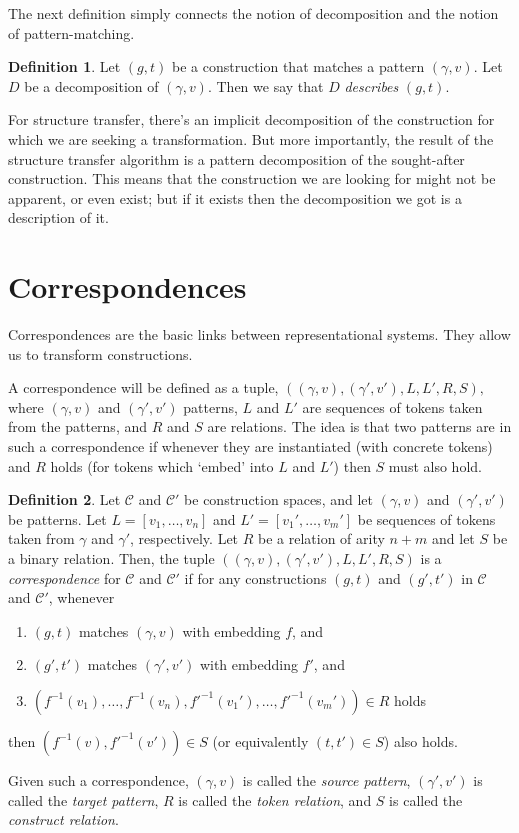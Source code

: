 \documentclass[a4paper]{article}
\theoremstyle{definition}
\newtheorem{definition}{Definition}
\begin{document}
	The next definition simply connects the notion of decomposition and the notion of pattern-matching. 
	\begin{definition}
		Let $(g,t)$ be a construction that matches a pattern $(\gamma,v)$. Let $D$ be a decomposition of $(\gamma,v)$. Then we say that $D$ \textit{describes} $(g,t)$.
	\end{definition}
	
	For structure transfer, there's an implicit decomposition of the construction for which we are seeking a transformation. But more importantly, the result of the structure transfer algorithm is a pattern decomposition of the sought-after construction. This means that the construction we are looking for might not be apparent, or even exist; but if it exists then the decomposition we got is a description of it.
	
	\section{Correspondences}
	Correspondences are the basic links between representational systems. They allow us to transform constructions.
	
	A correspondence will be defined as a tuple, $((\gamma,v),(\gamma',v'),L,L',R, S),$
	where $(\gamma,v)$ and $(\gamma',v')$ patterns, $L$ and $L'$ are sequences of tokens taken from the patterns, and $R$ and $S$ are relations. The idea is that two patterns are in such a correspondence if whenever they are instantiated (with concrete tokens) and $R$ holds (for tokens which `embed' into $L$ and $L'$) then $S$ must also hold.
	
	\newpage
	\begin{definition}
		Let $\mathcal{C}$ and $\mathcal{C}'$ be construction spaces, and let $(\gamma,v)$ and $(\gamma',v')$ be patterns. Let $L=[v_1,\ldots,v_n]$ and $L'=[v_1',\ldots,v_m']$ be sequences of tokens taken from $\gamma$ and $\gamma'$, respectively. Let $R$ be a relation of arity $n+m$ and let $S$ be a binary relation. Then, the tuple $((\gamma,v),(\gamma',v'),L,L',R, S)$ is a \textit{correspondence} for $\mathcal{C}$ and $\mathcal{C}'$ if 
		for any constructions $(g,t)$ and $(g',t')$ in $\mathcal{C}$ and $\mathcal{C}'$, whenever
		\begin{enumerate}[itemsep=1pt]
			\item $(g,t)$ matches $(\gamma,v)$ with embedding $f$, and
			\item $(g',t')$ matches $(\gamma',v')$ with embedding $f'$, and
			\item $(f^{-1}(v_1),\ldots,f^{-1}(v_n),f'^{-1}(v_1'),\ldots,f'^{-1}(v_m')) \in R$ holds
		\end{enumerate}
		then $(f^{-1}(v),f'^{-1}(v'))\in S$ (or equivalently $(t,t')\in S$) also holds.
		
		Given such a correspondence, $(\gamma,v)$ is called the \textit{source pattern}, $(\gamma',v')$ is called the \textit{target pattern}, $R$ is called the \textit{token relation}, and $S$ is called the \textit{construct relation}.
	\end{definition}
\end{document}
